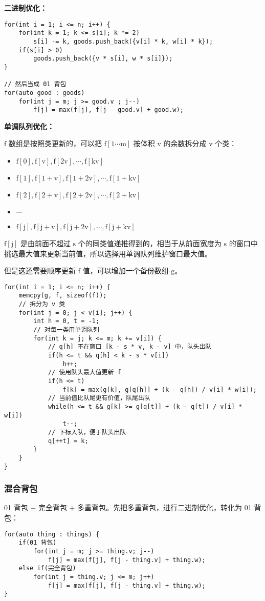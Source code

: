 \documentclass[UTF8]{article}
\begin{document}
\noindent \textbf{二进制优化：}
\begin{lstlisting}[caption=多重背包二进制优化]
for(int i = 1; i <= n; i++) {
	for(int k = 1; k <= s[i]; k *= 2)
		s[i] -= k, goods.push_back({v[i] * k, w[i] * k});
	if(s[i] > 0)
		goods.push_back({v * s[i], w * s[i]});
}

// 然后当成 01 背包
for(auto good : goods) 
	for(int j = m; j >= good.v ; j--)
		f[j] = max(f[j], f[j - good.v] + good.w);
\end{lstlisting}

\noindent \textbf{单调队列优化：}

$\mathrm{f}$ 数组是按照类更新的，可以把 $\mathrm{f[1 \cdots m]}$ 按体积 $\mathrm{v}$ 的余数拆分成 $\mathrm{v}$ 个类：

\begin{itemize}
	\item $\mathrm{f[0], f[v], f[2v], \cdots, f[kv]}$
	\item $\mathrm{f[1], f[1 + v], f[1 + 2v], \cdots, f[1 + kv]}$
	\item $\mathrm{f[2], f[2 + v], f[2 + 2v], \cdots, f[2 + kv]}$
	\item $\mathrm{\cdots}$
	\item $\mathrm{f[j], f[j + v], f[j + 2v], \cdots, f[j + kv]}$
\end{itemize}

$\mathrm{f[j]}$ 是由前面不超过 $\mathrm{s}$ 个的同类值递推得到的，相当于从前面宽度为 $\mathrm{s}$ 的窗口中挑选最大值来更新当前值，所以选择用单调队列维护窗口最大值。

但是这还需要顺序更新 $\mathrm{f}$ 值，可以增加一个备份数组 $\mathrm{g}$。
\begin{lstlisting}[caption=多重背包单调队列优化]
for(int i = 1; i <= n; i++) {
	memcpy(g, f, sizeof(f));
	// 拆分为 v 类
	for(int j = 0; j < v[i]; j++) {
		int h = 0, t = -1;
		// 对每一类用单调队列
		for(int k = j; k <= m; k += v[i]) {
			// q[h] 不在窗口 [k - s * v, k - v] 中，队头出队
			if(h <= t && q[h] < k - s * v[i])
				h++;
			// 使用队头最大值更新 f
			if(h <= t)
				f[k] = max(g[k], g[q[h]] + (k - q[h]) / v[i] * w[i]);
			// 当前值比队尾更有价值，队尾出队
			while(h <= t && g[k] >= g[q[t]] + (k - q[t]) / v[i] * w[i])
				t--;
			// 下标入队，便于队头出队
			q[++t] = k;
		}
	}
}
\end{lstlisting}


\subsubsection{混合背包}
01 背包 + 完全背包 + 多重背包。先把多重背包，进行二进制优化，转化为 01 背包：
\begin{lstlisting}[caption=混合背包]
for(auto thing : things) {
	if(01 背包)
		for(int j = m; j >= thing.v; j--)
			f[j] = max(f[j], f[j - thing.v] + thing.w);
	else if(完全背包)
		for(int j = thing.v; j <= m; j++)
			f[j] = max(f[j], f[j - thing.v] + thing.w);
}
\end{lstlisting}
\end{document}
